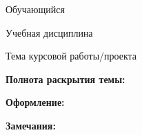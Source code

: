 \documentclass[14pt,a4paper]{extreport}
\begin{document}
\begin{singlespacing}
\vspace{0.5em}
\noindent Обучающийся\underline{\hspace{10cm}}

\vspace{0.3em}
\noindent Учебная дисциплина\underline{\hspace{9cm}}

\vspace{0.3em}
\noindent Тема курсовой работы/проекта \underline{\hspace{8.5cm}}

\vspace{0.3em}
\noindent\underline{\hspace{\textwidth}}

\vspace{0.5em}
\noindent\textbf{Полнота раскрытия темы:} \underline{\hspace{8.5cm}}

\vspace{0.3em}
\noindent\underline{\hspace{\textwidth}}

\vspace{0.3em}
\noindent\underline{\hspace{\textwidth}}

\vspace{0.3em}
\noindent\underline{\hspace{\textwidth}}

\vspace{0.3em}
\noindent\underline{\hspace{\textwidth}}

\vspace{0.3em}
\noindent\underline{\hspace{\textwidth}}

\vspace{0.3em}
\noindent\underline{\hspace{\textwidth}}

\vspace{0.5em}
\noindent\textbf{Оформление:}\underline{\hspace{10cm}}

\vspace{0.3em}
\noindent\underline{\hspace{\textwidth}}

\vspace{0.3em}
\noindent\underline{\hspace{\textwidth}}

\vspace{0.5em}
\noindent\textbf{Замечания:}\underline{\hspace{10.5cm}}


\end{singlespacing}
\end{document}
